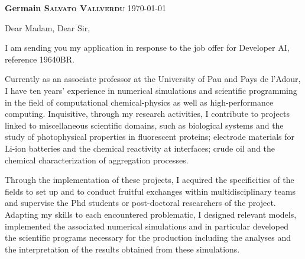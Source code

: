 \documentclass[11pt,a4paper,ragged2e]{../alta_letter}
\begin{document}
\name{}
\tagline{}


{\color{emphasis}\Large\bfseries Germain \textsc{Salvato Vallverdu}}
\hfill\today\par

\parbox{.5\textwidth}{\makecvheader}

\justify

\vspace{-5mm}
\cvsection{~}

\setlength{\parindent}{0pt}
\setlength{\parskip}{1.5ex plus 0.5ex minus 0.5ex}

\bigskip

Dear Madam, Dear Sir,

\medskip
\onehalfspacing

I am sending you my application in response to the job offer for Developer AI, reference 19640BR.

Currently as an associate professor at the University of Pau and Pays de l'Adour, I have ten years' experience in numerical simulations and scientific programming in the field of computational chemical-physics as well as high-performance computing. Inquisitive, through my research activities, I contribute to projects linked to miscellaneous scientific domains, such as biological systems and the study of photophysical properties in fluorescent proteins; electrode materials for Li-ion batteries and the chemical reactivity at interfaces; crude oil and the chemical characterization of aggregation processes.

Through the implementation of these projects, I acquired the specificities of the fields to set up and to conduct fruitful exchanges within multidisciplinary teams and supervise the Phd students or post-doctoral researchers of the project. Adapting my skills to each encountered problematic, I designed relevant models, implemented the associated numerical simulations and in particular developed the scientific programs necessary for the production including the analyses and the interpretation of the results obtained from these simulations.
\end{document}
